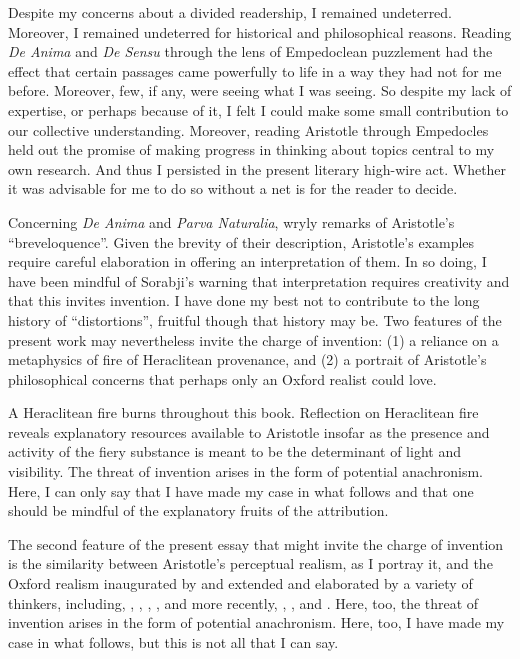Despite my concerns about a divided readership, I remained undeterred. Moreover, I remained undeterred for historical and philosophical reasons. Reading \emph{De Anima} and \emph{De Sensu} through the lens of Empedoclean puzzlement had the effect that certain passages came powerfully to life in a way they had not for me before. Moreover, few, if any, were seeing what I was seeing. So despite my lack of expertise, or perhaps because of it, I felt I could make some small contribution to our collective understanding. Moreover, reading Aristotle through Empedocles held out the promise of making progress in thinking about topics central to my own research. And thus I persisted in the present literary high-wire act. Whether it was advisable for me to do so without a net is for the reader to decide.

Concerning \emph{De Anima} and \emph{Parva Naturalia}, \citet[vii]{Hammond:1902kx} wryly remarks of Aristotle's ``breveloquence''. Given the brevity of their description, Aristotle's examples require careful elaboration in offering an interpretation of them. In so doing, I have been mindful of Sorabji's \citeyearpar[225]{Sorabji:2003fk} warning that interpretation requires creativity and that this invites invention. I have done my best not to contribute to the long history of ``distortions'', fruitful though that history may be. Two features of the present work may nevertheless invite the charge of invention: (1) a reliance on a metaphysics of fire of Heraclitean provenance, and (2) a portrait of Aristotle's philosophical concerns that perhaps only an Oxford realist could love. 

A Heraclitean fire burns throughout this book. Reflection on Heraclitean fire reveals explanatory resources available to Aristotle insofar as the presence and activity of the fiery substance is meant to be the determinant of light and visibility. The threat of invention arises in the form of potential anachronism. Here, I can only say that I have made my case in what follows and that one should be mindful of the explanatory fruits of the attribution. 

The second feature of the present essay that might invite the charge of invention is the similarity between Aristotle's perceptual realism, as I portray it, and the Oxford realism inaugurated by \citet{Cook-Wilson:1926sf} and extended and elaborated by a variety of thinkers, including, \citet{Prichard:1909yg,Prichard:1950kx}, \citet{Ryle:1949qr}, \citet{Austin:1961bs,Austin:1962lr}, \citet{Hinton:1973js}, and more recently, \citet{McDowell:1994am}, \citet{Travis:2008la}, and \citet{Williamson:2000lr}. Here, too, the threat of invention arises in the form of potential anachronism. Here, too, I have made my case in what follows, but this is not all that I can say. 

